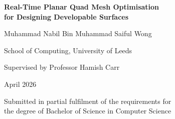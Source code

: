 \documentclass[12pt, a4paper, oneside]{report}
\begin{document}
\begin{titlepage}
  \centering
  \vspace*{2cm}
  {\LARGE\bfseries Real-Time Planar Quad Mesh Optimisation\\[0.5em]
   for Designing Developable Surfaces\par}
  \vspace{1.5cm}
  {\large Muhammad Nabil Bin Muhammad Saiful Wong\par}
  \vspace{0.5cm}
  {\large School of Computing, University of Leeds\par}
  \vspace{0.5cm}
  {\large Supervised by Professor Hamish Carr\par}
  \vspace{1cm}
  {\large April 2026\par}
  \vfill
  {\normalsize Submitted in partial fulfilment of the requirements for\\the
   degree of Bachelor of Science in Computer Science\par}
\end{titlepage}

\tableofcontents
\listoffigures
\listoftables
\clearpage
{}

% 
% 
% 


% 

\printbibliography[heading=bibintoc]
\end{document}
